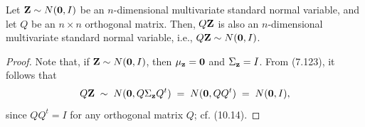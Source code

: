 \begin{lemma}
Let $\mathbf{Z} \sim N(\mathbf{0},I)$ be an $n$-dimensional multivariate standard normal variable, and
let $Q$ be an $n \times n$ orthogonal matrix. Then, $Q\mathbf{Z}$ is also an $n$-dimensional
multivariate standard normal variable, i.e., $Q\mathbf{Z} \sim N(\mathbf{0},I)$.
\end{lemma}

\begin{proof}
Note that, if $\mathbf{Z} \sim N(\mathbf{0},I)$, then $\mu_{\mathbf{z}} = \mathbf{0}$ and $\Sigma_{\mathbf{z}} = I$. From
(7.123), it follows that
\[
Q\mathbf{Z} \;\sim\; N(\mathbf{0},Q\Sigma_{\mathbf{z}}Q^t) \;=\; N(\mathbf{0},QQ^t) \;=\; N(\mathbf{0},I),
\]
since $QQ^t = I$ for any orthogonal matrix $Q$; cf. (10.14).
\end{proof}

